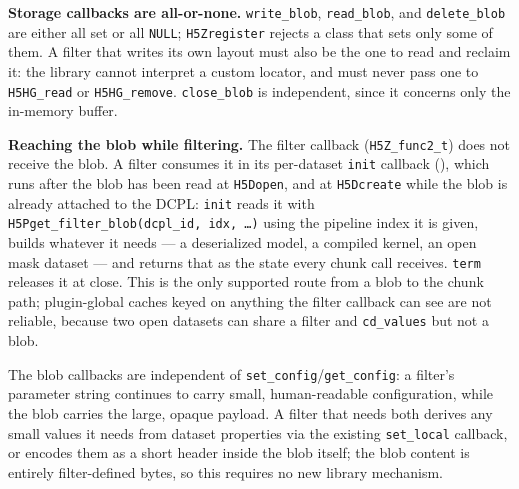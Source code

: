 \documentclass[../RFC-HDFG-2026-003.tex]{subfiles}
\begin{document}
\textbf{Storage callbacks are all-or-none.}  \texttt{write\_blob},
\texttt{read\_blob}, and \texttt{delete\_blob} are either all set or all
\texttt{NULL}; \texttt{H5Zregister} rejects a class that sets only some
of them.  A filter that writes its own layout must also be the one to
read and reclaim it: the library cannot interpret a custom locator, and
must never pass one to \texttt{H5HG\_read} or \texttt{H5HG\_remove}.
\texttt{close\_blob} is independent, since it concerns only the
in-memory buffer.

\textbf{Reaching the blob while filtering.}  The filter callback
(\texttt{H5Z\_func2\_t}) does not receive the blob.  A filter consumes it
in its per-dataset \texttt{init} callback (), which runs
after the blob has been read at \texttt{H5Dopen}, and at
\texttt{H5Dcreate} while the blob is already attached to the DCPL:
\texttt{init} reads it with
\texttt{H5Pget\_filter\_blob(dcpl\_id, idx, \ldots)} using the pipeline
index it is given, builds whatever it needs --- a deserialized model, a
compiled kernel, an open mask dataset --- and returns that as the state
every chunk call receives.  \texttt{term} releases it at close.  This is
the only supported route from a blob to the chunk path; plugin-global
caches keyed on anything the filter callback can see are not reliable,
because two open datasets can share a filter and \texttt{cd\_values} but
not a blob.

The blob callbacks are independent of \texttt{set\_config}/\texttt{get\_config}:
a filter's parameter string continues to carry small, human-readable
configuration, while the blob carries the large, opaque payload. A
filter that needs both derives any small values it needs from dataset
properties via the existing \texttt{set\_local} callback, or encodes
them as a short header inside the blob itself; the blob content is
entirely filter-defined bytes, so this requires no new library
mechanism.
\end{document}
